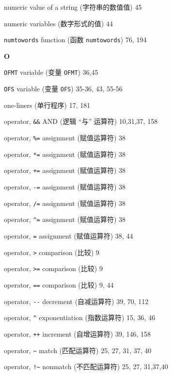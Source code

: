 \begin{multicols}{2}
\hangindent=2pc  numeric value of a string (字符串的数值值) 45

\hangindent=2pc  numeric variables (数字形式的值) 44

\hangindent=2pc  \verb'numtowords' function (函数
\verb'numtowords') 76, 194

\medskip\textbf{\large{O}}

\hangindent=2pc  \verb'OFMT' variable (变量 \verb'OFMT') 36,45

\hangindent=2pc  \verb'OFS' variable (变量 \verb'OFS')
35-36, 43, 55-56

\hangindent=2pc  one-liners (单行程序) 17, 181

\hangindent=2pc  operator, \verb'&&' AND (逻辑 ``与'' 运算符)
10,31,37, 158

\hangindent=2pc  operator, \verb'%=' assignment (赋值运算符) 38

\hangindent=2pc  operator, \verb'*=' assignment (赋值运算符) 38

\hangindent=2pc  operator, \verb'+=' assignment (赋值运算符) 38

\hangindent=2pc  operator, \verb'-=' assignment (赋值运算符) 38

\hangindent=2pc  operator, \verb'/=' assignment (赋值运算符) 38

\hangindent=2pc  operator, \verb'^=' assignment (赋值运算符) 38

\hangindent=2pc  operator, \verb'=' assignment (赋值运算符) 38, 44

\hangindent=2pc  operator, \verb'>' comparison (比较) 9

\hangindent=2pc  operator, \verb'>=' comparison (比较) 9

\hangindent=2pc  operator, \verb'==' comparison (比较) 9, 44

\hangindent=2pc  operator, \verb'--' decrement (自减运算符)
39, 70, 112

\hangindent=2pc  operator, \verb'^' exponentiation (指数运算符)
15, 36, 46

\hangindent=2pc  operator, \verb'++' increment (自增运算符)
39, 146, 158

\hangindent=2pc  operator, \verb'~' match (匹配运算符) 25, 27, 31, 37, 40

\hangindent=2pc  operator, \verb'!~' nonmatch (不匹配运算符)
25, 27, 31,37,40


\end{multicols}
